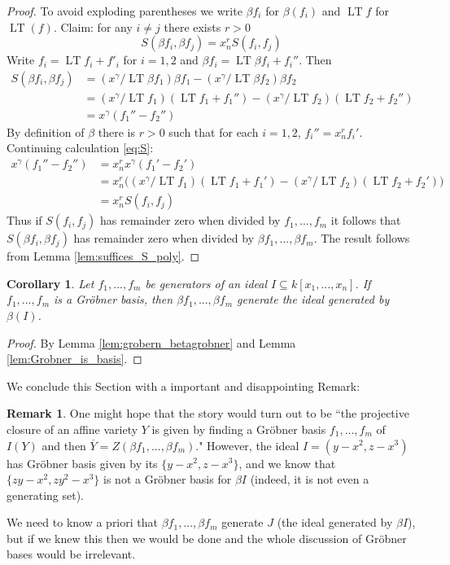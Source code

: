 \documentclass[12pt]{article}
\theoremstyle{plain}
\newtheorem{cor}[thm]{Corollary}
\theoremstyle{definition}
\newtheorem{remark}[thm]{Remark}
\begin{document}
\begin{proof}
To avoid exploding parentheses we write $\beta f_i$ for $\beta(f_i)$ and $\operatorname{LT}f$ for $\operatorname{LT}(f)$. Claim: for any $i \neq j$ there exists $r > 0$
\begin{equation}\label{eq:leading_term_equality}
    S(\beta f_i,\beta f_j) = x_{n}^r S(f_i,f_j)
\end{equation}
Write $f_i = \operatorname{LT} f_i + f'_i$ for $i = 1,2$ and $\beta f_i = \operatorname{LT}\beta f_i + f_i''$. Then
\begin{align}
    S(\beta f_i, \beta f_j) &= (x^\gamma/\operatorname{LT} \beta f_1) \beta f_1 - (x^\gamma/\operatorname{LT}\beta f_2)\beta f_2\\
    &= (x^\gamma/\operatorname{LT} f_1) (\operatorname{LT}f_1 + f_1'') - (x^\gamma/\operatorname{LT}f_2)(\operatorname{LT}f_2 + f_2'')\\
    &= x^\gamma (f_1'' - f_2'')\label{eq:S}
\end{align}
By definition of $\beta$ there is $r > 0$ such that for each $i = 1,2$, $f_i'' = x_n^r f_i'$. Continuing calculation \eqref{eq:S}:
\begin{align*}
    x^\gamma (f_1'' - f_2'') &= x_n^r x^\gamma (f_1' - f_2')\\
    &= x_n^r\Big((x^\gamma/\operatorname{LT} f_1) (\operatorname{LT}f_1 + f_1') - (x^\gamma/\operatorname{LT}f_2)(\operatorname{LT}f_2 + f_2')\Big)\\
    &= x_n^r S(f_i,f_j)
\end{align*}
Thus if $S(f_i,f_j)$ has remainder zero when divided by $f_1,...,f_m$ it follows that $S(\beta f_i, \beta f_j)$ has remainder zero when divided by $\beta f_1,...,\beta f_m$. The result follows from Lemma \ref{lem:suffices_S_poly}.
\end{proof}
\begin{cor}\label{cor:relate_beta_grobner}
Let $f_1,...,f_m$ be generators of an ideal $I \subseteq k[x_1,...,x_n]$. If $f_1,...,f_m$ is a Gr\"{o}bner basis, then $\beta f_1,...,\beta f_m$ generate the ideal generated by $\beta(I)$.
\end{cor}
\begin{proof}
By Lemma \ref{lem:grobern_betagrobner} and Lemma \ref{lem:Grobner_is_basis}.
\end{proof}
We conclude this Section with a important and disappointing Remark:
\begin{remark}
One might hope that the story would turn out to be ``the projective closure of an affine variety $Y$ is given by finding a Gr\"{o}bner basis $f_1,...,f_m$ of $I(Y)$ and then $\overline{Y} = Z(\beta f_1,...,\beta f_m)$." However, the ideal $I = (y - x^2, z - x^3)$ has Gr\"{o}bner basis given by its $\lbrace y - x^2, z-x^3\rbrace$, and we know that $\lbrace zy - x^2, zy^2 - x^3\rbrace$ is not a Gr\"{o}bner basis for $\beta I$ (indeed, it is not even a generating set). 

We need to know a priori that $\beta f_1, ..., \beta f_m$ generate $J$ (the ideal generated by $\beta I$), but if we knew this then we would be done and the whole discussion of Gr\"{o}bner bases would be irrelevant.
\end{remark}
\end{document}
